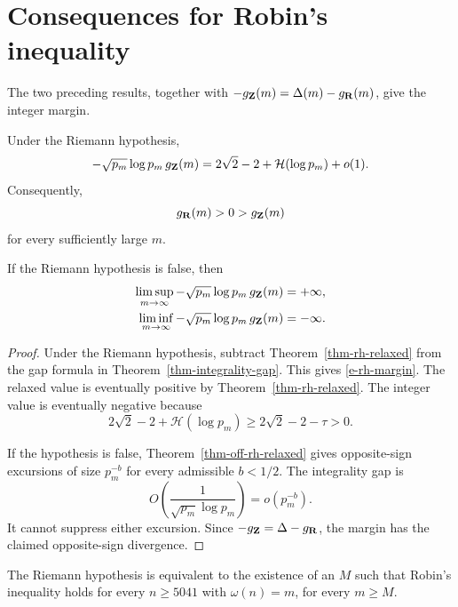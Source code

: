 \section{Consequences for Robin's inequality}
\label{s-robin-margin}

The two preceding results, together with
\(-g_{\mathbf{Z}}(m)=\Delta(m)-g_{\mathbf{R}}(m)\), give the integer margin.

\begin{theorem}
\label{thm-rh-margin}
Under the Riemann hypothesis,
\begin{equation}
\label{e-rh-margin}
    -\sqrt{p_m}\log p_m\,g_{\mathbf{Z}}(m)
    =
    2\sqrt2-2+\mathcal H(\log p_m)+o(1).
\end{equation}
Consequently,
\[
    g_{\mathbf{R}}(m)>0>g_{\mathbf{Z}}(m)
\]
for every sufficiently large \(m\).

If the Riemann hypothesis is false, then
\[
\begin{aligned}
    \limsup_{m\to\infty}
    -\sqrt{p_m}\log p_m\,g_{\mathbf{Z}}(m)
    &=+\infty,\\
    \liminf_{m\to\infty}
    -\sqrt{p_m}\log p_m\,g_{\mathbf{Z}}(m)
    &=-\infty.
\end{aligned}
\]
\end{theorem}

\begin{proof}
Under the Riemann hypothesis, subtract
Theorem~\ref{thm-rh-relaxed} from the gap formula in
Theorem~\ref{thm-integrality-gap}. This gives \eqref{e-rh-margin}.
The relaxed value is eventually positive by
Theorem~\ref{thm-rh-relaxed}. The integer value is eventually negative
because
\[
    2\sqrt2-2+\mathcal H(\log p_m)
    \geq
    2\sqrt2-2-\tau
    >
    0.
\]

If the hypothesis is false, Theorem~\ref{thm-off-rh-relaxed} gives
opposite-sign excursions of size \(p_m^{-b}\) for every admissible
\(b<1/2\). The integrality gap is
\[
    O\left(\frac1{\sqrt{p_m}\log p_m}\right)
    =
    o(p_m^{-b}).
\]
It cannot suppress either excursion. Since
\(-g_{\mathbf{Z}}=\Delta-g_{\mathbf{R}}\), the margin has the claimed
opposite-sign divergence.
\end{proof}

\begin{corollary}
\label{cor-fixed-omega-equivalence}
The Riemann hypothesis is equivalent to the existence of an \(M\) such
that Robin's inequality holds for every \(n\geq5041\) with
\(\omega(n)=m\), for every \(m\geq M\).
\end{corollary}

